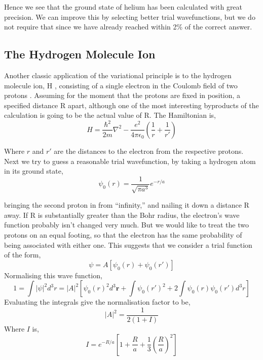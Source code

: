 Hence we see that the ground state of helium has been calculated with great precision. We can improve this by selecting better trial wavefunctions, but we do not require that since we have already reached within 2\% of the correct answer.
\subsection{The Hydrogen Molecule Ion}
Another classic application of the variational principle is to the hydrogen molecule ion, H , consisting of a
single electron in the Coulomb field of two protons . Assuming for the moment that the
protons are fixed in position, a specified distance R apart, although one of the most interesting byproducts of
the calculation is going to be the actual value of R. The Hamiltonian is,
\begin{equation}
	H=\frac{\hbar^2}{2m}\nabla^2-\frac{e^2}{4\pi\epsilon_0}\left(\frac{1}{r}+\frac{1}{r'}\right)
\end{equation}

Where $r$ and $r'$ are the distances to the electron from the respective protons. Next we try to guess a reasonable trial wavefunction, by taking a hydrogen atom in its ground state,
\begin{equation}
	\psi_0(r)=\frac{1}{\sqrt{\pi a^3}}e^{-r/a}
\end{equation}

bringing the second proton in from “infinity,” and nailing it down a distance R away. If R is substantially
greater than the Bohr radius, the electron’s wave function probably isn’t changed very much. But we would
like to treat the two protons on an equal footing, so that the electron has the same probability of being
associated with either one. This suggests that we consider a trial function of the form,
\begin{equation}
	\psi=A[\psi_0(r)+\psi_0(r')]
\end{equation}
Normalising this wave function,
\begin{equation}
	1=\int|\psi|^2d^3r=|A|^2\left[\psi_0(r)^2d^3\bm{r}+\int\psi_0(r')^2+2\int\psi_0(r)\psi_0(r')d^3r\right]
\end{equation}
Evaluating the integrals give the normalisation factor to be,
\begin{equation}
	|A|^2=\frac{1}{2(1+I)}
\end{equation}
Where $I$ is,
\begin{equation}
	I=e^{-R/a}\left[1+\frac{R}{a}+\frac{1}{3}\left(\frac{R}{a}\right)^2\right]
\end{equation}

